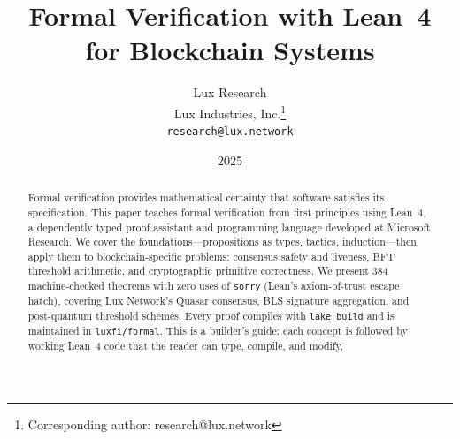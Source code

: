 \documentclass[11pt,a4paper]{article}
\title{Formal Verification with Lean~4 for Blockchain Systems}
\author{
Lux Research \\
Lux Industries, Inc.\thanks{Corresponding author: research@lux.network}\\
\texttt{research@lux.network}
}
\date{2025}
\begin{document}
\luxcoverpage

\begin{abstract}
Formal verification provides mathematical certainty that software satisfies its specification.
This paper teaches formal verification from first principles using Lean~4, a dependently typed
proof assistant and programming language developed at Microsoft Research. We cover the
foundations---propositions as types, tactics, induction---then apply them to blockchain-specific
problems: consensus safety and liveness, BFT threshold arithmetic, and cryptographic
primitive correctness. We present 384 machine-checked theorems with zero uses of
\texttt{sorry} (Lean's axiom-of-trust escape hatch), covering Lux Network's Quasar
consensus, BLS signature aggregation, and post-quantum threshold schemes. Every proof
compiles with \texttt{lake build} and is maintained in \texttt{luxfi/formal}. This is a
builder's guide: each concept is followed by working Lean~4 code that the reader can type,
compile, and modify.
\end{abstract}

\tableofcontents
\newpage













\end{document}
